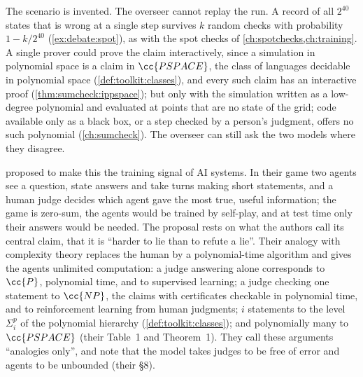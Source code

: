 \begin{refsection}
The scenario is invented. The overseer cannot replay the run. A record of all $2^{40}$ states that is wrong at a single step survives $k$ random checks with probability $1-k/2^{40}$ (\cref{ex:debate:spot}), as with the spot checks of \cref{ch:spotchecks,ch:training}. A single prover could prove the claim interactively, since a simulation in polynomial space is a claim in $\cc{PSPACE}$, the class of languages decidable in polynomial space (\cref{def:toolkit:classes}), and every such claim has an interactive proof (\cref{thm:sumcheck:ippspace}); but only with the simulation written as a low-degree polynomial and evaluated at points that are no state of the grid; code available only as a black box, or a step checked by a person's judgment, offers no such polynomial (\cref{ch:sumcheck}). The overseer can still ask the two models where they disagree.

\Textcite{IrvingEtAl2018} proposed to make this the training signal of AI systems. In their  game two agents see a question, state answers and take turns making short statements, and a human judge decides which agent gave the most true, useful information; the game is zero-sum, the agents would be trained by self-play, and at test time only their answers would be needed. The proposal rests on what the authors call its central claim, that it is ``harder to lie than to refute a lie''. Their analogy with complexity theory replaces the human by a polynomial-time algorithm and gives the agents unlimited computation: a judge answering alone corresponds to $\cc{P}$, polynomial time, and to supervised learning; a judge checking one statement to $\cc{NP}$, the claims with certificates checkable in polynomial time, and to reinforcement learning from human judgments; $i$ statements to the level $\Sigma_i^p$ of the polynomial hierarchy (\cref{def:toolkit:classes}); and polynomially many to $\cc{PSPACE}$ (their Table~1 and Theorem~1). They call these arguments ``analogies only'', and note that the model takes judges to be free of error and agents to be unbounded (their \S8).


\end{refsection}
